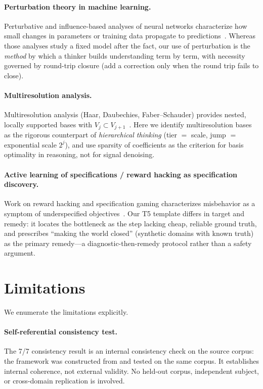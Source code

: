 \documentclass[11pt]{article}
\begin{document}
\paragraph{Perturbation theory in machine learning.}
Perturbative and influence-based analyses of neural networks characterize how
small changes in parameters or training data propagate to
predictions~\cite{kaspschak_nnpt_2020,koh_liang_influence_2017}. Whereas those
analyses study a fixed model after the fact, our use of perturbation is the
\emph{method} by which a thinker builds understanding term by term, with
necessity governed by round-trip closure (add a correction only when the round
trip fails to close).

\paragraph{Multiresolution analysis.}
Multiresolution analysis (Haar, Daubechies, Faber--Schauder) provides nested,
locally supported bases with $V_j\subset V_{j+1}$~\cite{daubechies_1988}.
Here we identify multiresolution bases as the rigorous counterpart of
\emph{hierarchical thinking} (tier $=$ scale, jump $=$ exponential scale $2^j$),
and use sparsity of coefficients as the criterion for basis optimality in
reasoning, not for signal denoising.

\paragraph{Active learning of specifications / reward hacking as specification discovery.}
Work on reward hacking and specification gaming characterizes misbehavior as a
symptom of underspecified objectives~\cite{skalse_reward_hacking_2022,gallego_spec_self_correction_2025}.
Our T5 template differs in target and remedy: it locates the bottleneck as the
step lacking cheap, reliable ground truth, and prescribes ``making the world
closed'' (synthetic domains with known truth) as the primary remedy---a
diagnostic-then-remedy protocol rather than a safety argument.
\section{Limitations}
\label{sec:limitations}

We enumerate the limitations explicitly.

\paragraph{Self-referential consistency test.}
The 7/7 consistency result is an internal consistency check on the source
corpus: the framework was constructed from and tested on the same corpus. It
establishes internal coherence, not external validity. No held-out corpus,
independent subject, or cross-domain replication is involved.
\end{document}
